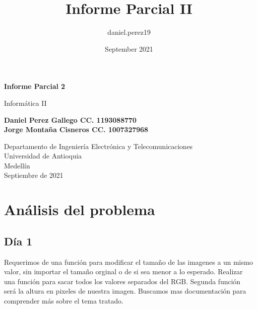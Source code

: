 \documentclass{article}
\title{Informe Parcial II}
\author{daniel.perez19 }
\date{September 2021}
\begin{document}
\begin{titlepage}
    \begin{center}
        \vspace*{1cm}
            
        \Huge
        \textbf{Informe Parcial 2}
            
        \vspace{0.5cm}
        \LARGE
        Informática II
            
        \vspace{1.5cm}
            
        \textbf{Daniel Perez Gallego CC. 1193088770\\Jorge Montaña Cisneros CC.  1007327968}
            
        \vfill
            
        \vspace{0.8cm}
            
        \Large
        Departamento de Ingeniería Electrónica y Telecomunicaciones\\
        Universidad de Antioquia\\
        Medellín\\
        Septiembre de 2021
            
    \end{center}
\end{titlepage}

\tableofcontents

\section{Análisis del problema}
\subsection{Día 1}
Requerimos de una función para modificar el tamaño de las imagenes a un mismo valor, sin importar el tamaño orginal o de si sea menor a lo esperado.
Realizar una función para sacar todos los valores separados del RGB.
Segunda función será la altura en pixeles de nuestra imagen. Buscamos mas documentación para comprender más sobre el tema tratado.
\end{document}

